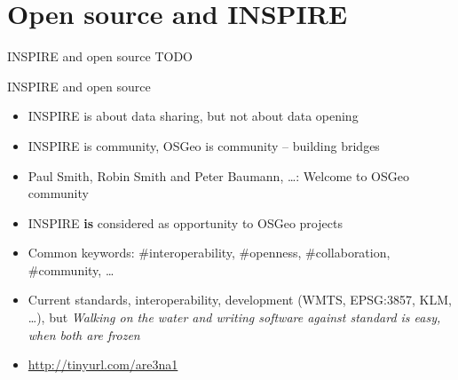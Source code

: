 \documentclass[xcolor=dvipsnames]{beamer}
\begin{document}
\section{Open source and INSPIRE}
\begin{frame}{INSPIRE and open source}
    \LARGE{TODO}
\end{frame}

\begin{frame}{INSPIRE and open source}
    \begin{itemize}
        \item INSPIRE is about data sharing, but not about data opening
            \pause
        \item INSPIRE is community, OSGeo is community -- building bridges
            \pause
        \item  Paul Smith, Robin Smith and Peter Baumann, \dots: Welcome
            to OSGeo community
            \pause
        \item  INSPIRE {\bf is} considered as opportunity to OSGeo projects
            \pause
        \item Common keywords: \#interoperability, \#openness, \#collaboration,
            \#community, \dots
            \pause
        \item Current standards, interoperability, development (WMTS, EPSG:3857,
            KLM, \dots), but {\em Walking on the water and writing software
            against standard is easy, when both are frozen}
            \pause
        \item \url{http://tinyurl.com/are3na1}
    \end{itemize}
\end{frame}
\end{document}
